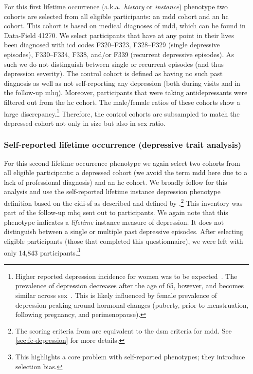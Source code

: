 For this first lifetime occurrence (a.k.a.~\emph{history} or \emph{instance}) phenotype two cohorts are selected from all eligible participants: an \gls{mdd} cohort and an \gls{hc} cohort.
This cohort is based on medical diagnoses of \gls{mdd}, which can be found in Data-Field 41270.
We select participants that have at any point in their lives been diagnosed with \gls{icd} codes F320--F323, F328--F329 (single depressive episodes), F330--F334, F338, and/or F339 (recurrent depressive episodes).
As such we do not distinguish between single or recurrent episodes (and thus depression severity).
The control cohort is defined as having no such past diagnosis as well as not self-reporting any depression (both during visits and in the follow-up \gls{mhq}).
Moreover, participants that were taking antidepressants were filtered out from the \gls{hc} cohort.
%
The male/female ratios of these cohorts show a large discrepancy.\footnote{Higher reported depression incidence for women was to be expected~\parencite{Albert2015, Bogren2018}. The prevalence of depression decreases after the age of 65, however, and becomes similar across sex~\parencite{Bebbington2003}. This is likely influenced by female prevalence of depression peaking around hormonal changes (puberty, prior to menstruation, following pregnancy, and perimenopause).}
Therefore, the control cohorts are subsampled to match the depressed cohort not only in size but also in sex ratio.

\subsubsection{Self-reported lifetime occurrence (depressive trait analysis)}

For this second lifetime occurrence phenotype we again select two cohorts from all eligible participants: a depressed cohort (we avoid the term \gls{mdd} here due to a lack of professional diagnosis) and an \gls{hc} cohort.
We broadly follow \textcite{Howard2020} for this analysis and use the self-reported lifetime instance depression phenotype definition based on the \gls{cidi-sf} \parencite{Kessler1998} as described and defined by \textcite{Davis2020}.\footnote{The scoring criteria from \textcite{Davis2020} are equivalent to the \gls{dsm} criteria for \gls{mdd}. See \cref{sec:fc-depression} for more details.}
This inventory was part of the follow-up \gls{mhq} sent out to participants.
We again note that this phenotype indicates a \emph{lifetime} instance measure of depression.
It does not distinguish between a single or multiple past depressive episodes.
After selecting eligible participants (those that completed this questionnaire), we were left with only 14,843 participants.\footnote{This highlights a core problem with self-reported phenotypes; they introduce selection bias.}


